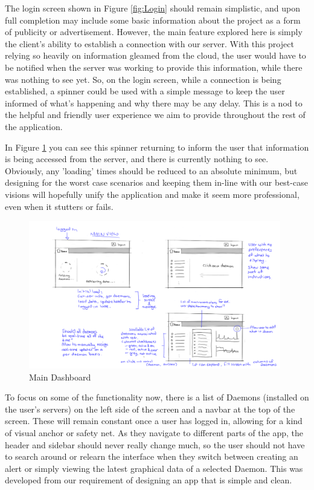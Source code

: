 \documentclass{l3proj}
\begin{document}
The login screen shown in Figure \ref{fig:Login} should remain simplistic, and upon full completion may include some basic information about the project as a form of publicity or advertisement. However, the main feature explored here is simply the client's ability to establish a connection with our server.  With this project relying so heavily on information gleamed from the cloud, the user would have to be notified when the server was working to provide this information, while there was nothing to see yet. So, on the login screen, while a connection is being established, a spinner could be used with a simple message to keep the user informed of what's happening and why there may be any delay. This is a nod to the helpful and friendly user experience we aim to provide throughout the rest of the application.

In Figure \ref{fig:MainDash} you can see this spinner returning to inform the user that information is being accessed from the server, and there is currently nothing to see.  Obviously, any 'loading' times should be reduced to an absolute minimum, but designing for the worst case scenarios and keeping them in-line with our best-case visions will hopefully unify the application and make it seem more professional, even when it stutters or fails.

\begin{figure}[H]
\centering
\includegraphics[width=110mm]{Concept_Designs/MainView.png}
\caption{Main Dashboard}
\label{fig:MainDash}
\end{figure}

To focus on some of the functionality now, there is a list of Daemons (installed on the user's servers) on the left side of the screen and a navbar at the top of the screen. These will remain constant once a user has logged in, allowing for a kind of visual anchor or safety net. As they navigate to different parts of the app, the header and sidebar should never really change much, so the user should not have to search around or relearn the interface when they switch between creating an alert or simply viewing the latest graphical data of a selected Daemon. This was developed from our requirement of designing an app that is simple and clean.
\end{document}
